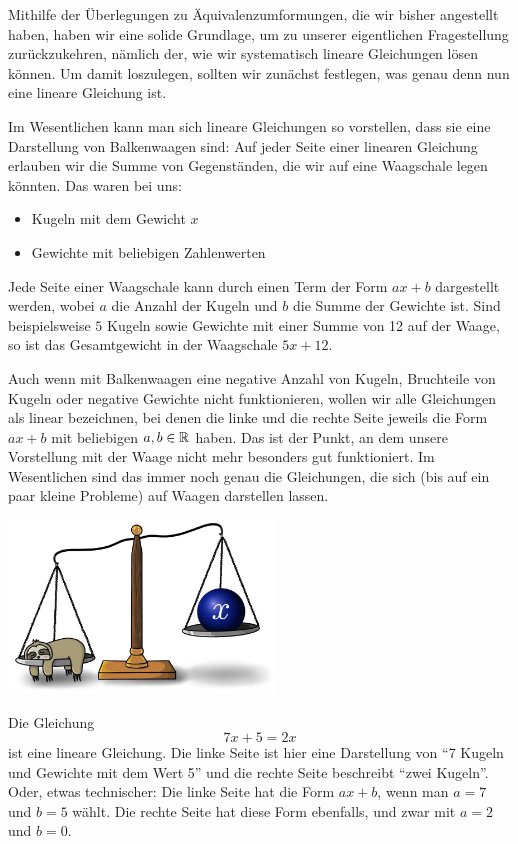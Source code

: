\documentclass[../../main.tex]{subfiles}
\begin{document}
Mithilfe der Überlegungen zu Äquivalenzumformungen, die wir bisher angestellt haben, haben wir eine solide Grundlage, um zu unserer eigentlichen Fragestellung zurückzukehren, nämlich der, wie wir systematisch lineare Gleichungen lösen können. Um damit loszulegen, sollten wir zunächst festlegen, was genau denn nun eine lineare Gleichung ist.

Im Wesentlichen kann man sich lineare Gleichungen so vorstellen, dass sie eine Darstellung von Balkenwaagen sind: Auf jeder Seite einer linearen Gleichung erlauben wir die Summe von Gegenständen, die wir auf eine Waagschale legen könnten. Das waren bei uns:
\begin{itemize}
    \item Kugeln mit dem Gewicht $x$
    \item Gewichte mit beliebigen Zahlenwerten
\end{itemize}

Jede Seite einer Waagschale kann durch einen Term der Form $ax+b$ dargestellt werden, wobei $a$ die Anzahl der Kugeln und $b$ die Summe der Gewichte ist. Sind beispielsweise $5$ Kugeln sowie Gewichte mit einer Summe von 12 auf der Waage, so ist das Gesamtgewicht in der Waagschale $5x+12$.

Auch wenn mit Balkenwaagen eine negative Anzahl von Kugeln, Bruchteile von Kugeln oder negative Gewichte nicht funktionieren, wollen wir alle Gleichungen als linear bezeichnen, bei denen die linke und die rechte Seite jeweils die Form $ax+b$ mit beliebigen $a,b\in\mathbb{R}$ haben. Das ist der Punkt, an dem unsere Vorstellung mit der Waage nicht mehr besonders gut funktioniert. Im Wesentlichen sind das immer noch genau die Gleichungen, die sich (bis auf ein paar kleine Probleme) auf Waagen darstellen lassen.

\begin{center}
    \includegraphics[height=4.6cm]{images/faultier-balkenwaage.jpg}
\end{center}
\vfill

\begin{example}{}
    Die Gleichung 
    \[7x+5=2x\] 
    ist eine lineare Gleichung. Die linke Seite ist hier eine Darstellung von \enquote{7 Kugeln und Gewichte mit dem Wert 5} und die rechte Seite beschreibt \enquote{zwei Kugeln}. Oder, etwas technischer: Die linke Seite hat die Form $ax+b$, wenn man $a=7$ und $b=5$ wählt. Die rechte Seite hat diese Form ebenfalls, und zwar mit $a=2$ und $b=0$.
\end{example}
\end{document}
